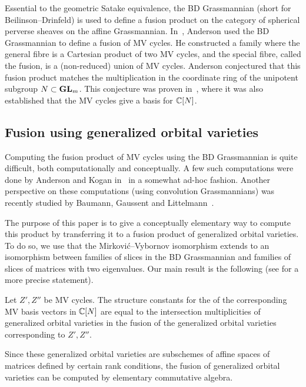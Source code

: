 \documentclass{article}
\begin{document}
Essential to the geometric Satake equivalence, the BD Grassmannian (short for Beilinson--Drinfeld) is used to define a fusion product on the category of spherical perverse sheaves on the affine Grassmannian.  In~\cite{anderson2003polytope}, Anderson used the BD Grassmannian to define a fusion of MV cycles.  He constructed a family where the general fibre is a Cartesian product of two MV cycles, and the special fibre, called the fusion, is a (non-reduced) union of MV cycles.  Anderson conjectured that this fusion product matches the multiplication in the coordinate ring of the unipotent subgroup \( N \subset{\mathbf{GL}}_m\).  This conjecture was proven in~\cite{baumann2019mirkovic}, where it was also established that the MV cycles give a basis for \( \mathbb C[N]\).


\subsection{Fusion using generalized orbital varieties}\label{ss:fugov}
% 
Computing the fusion product of MV cycles using the BD Grassmannian is quite difficult, both computationally and conceptually.  A few such computations were done by Anderson and Kogan in~\cite{anderson2006algebra} in a somewhat ad-hoc fashion.  Another perspective on these computations (using convolution Grassmannians) was recently studied by Baumann, Gaussent and Littelmann~\cite{baumann2020bases}.

The purpose of this paper is to give a conceptually elementary way to compute this product by transferring it to a fusion product of generalized orbital varieties.  To do so, we use that the Mirkovi\'c--Vybornov isomorphism extends to an isomorphism between families of slices in the BD Grassmannian and families of slices of matrices with two eigenvalues. Our main result is the following (see  for a more precise statement).

\begin{theorem}\label{thm:main}
    Let \( Z', Z'' \) be MV cycles. The structure constants for the of the corresponding MV basis vectors in \(\mathbb C[N]\) are equal to the intersection multiplicities of generalized orbital varieties in the fusion of the generalized orbital varieties corresponding to \( Z', Z''\).
\end{theorem}

Since these generalized orbital varieties are subschemes of affine spaces of matrices defined by certain rank conditions, the fusion of generalized orbital varieties can be computed by elementary commutative algebra.
\end{document}
